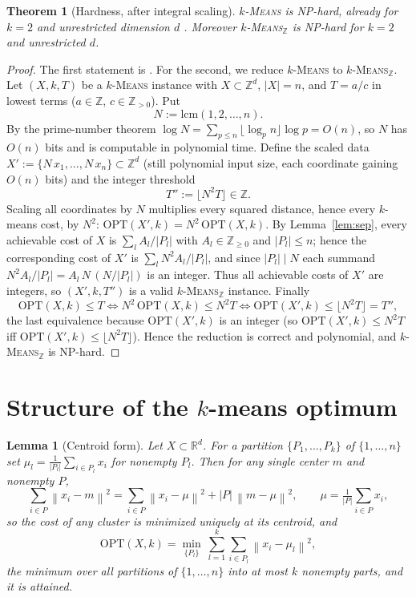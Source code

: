 \documentclass{amsart}
\theoremstyle{plain}
\newtheorem{theorem}{Theorem}
\newtheorem{lemma}{Lemma}
\theoremstyle{definition}
\newcommand{\R}{\mathbb{R}}
\newcommand{\Z}{\mathbb{Z}}
\newcommand{\norm}[1]{\left\lVert #1 \right\rVert}
\begin{document}
\begin{theorem}[Hardness, after integral scaling]\label{thm:kmnp}
\textsc{$k$-Means} is NP-hard, already for $k=2$ and unrestricted dimension $d$
\cite{ADHP}. Moreover \textsc{$k$-Means$_{\Z}$} is NP-hard for $k=2$ and
unrestricted $d$.
\end{theorem}

\begin{proof}
The first statement is \cite{ADHP}. For the second, we reduce \textsc{$k$-Means} to
\textsc{$k$-Means$_{\Z}$}. Let $(X,k,T)$ be a \textsc{$k$-Means} instance with
$X\subset\Z^{d}$, $|X|=n$, and $T=a/c$ in lowest terms ($a\in\Z$, $c\in\Z_{>0}$).
Put
\[
N:=\mathrm{lcm}(1,2,\dots,n).
\]
By the prime-number theorem $\log N=\sum_{p\le n}\lfloor\log_{p}n\rfloor\log p
=O(n)$, so $N$ has $O(n)$ bits and is computable in polynomial time. Define the
scaled data $X':=\{N\,x_{1},\dots,N\,x_{n}\}\subset\Z^{d}$ (still polynomial input
size, each coordinate gaining $O(n)$ bits) and the integer threshold
\[
T'':=\big\lfloor N^{2}T\big\rfloor\in\Z .
\]
Scaling all coordinates by $N$ multiplies every squared distance, hence every
$k$-means cost, by $N^{2}$:
\(
\mathrm{OPT}(X',k)=N^{2}\,\mathrm{OPT}(X,k).
\)
By Lemma~\ref{lem:sep}, every achievable cost of $X$ is $\sum_{l}A_{l}/|P_{l}|$
with $A_{l}\in\Z_{\ge0}$ and $|P_{l}|\le n$; hence the corresponding cost of $X'$ is
$\sum_{l}N^{2}A_{l}/|P_{l}|$, and since $|P_{l}|\mid N$ each summand
$N^{2}A_{l}/|P_{l}|=A_{l}\,N\,(N/|P_{l}|)$ is an integer. Thus all achievable costs
of $X'$ are integers, so $(X',k,T'')$ is a valid \textsc{$k$-Means$_{\Z}$}
instance. Finally
\[
\mathrm{OPT}(X,k)\le T
\iff N^{2}\,\mathrm{OPT}(X,k)\le N^{2}T
\iff \mathrm{OPT}(X',k)\le \lfloor N^{2}T\rfloor=T'',
\]
the last equivalence because $\mathrm{OPT}(X',k)$ is an integer (so
$\mathrm{OPT}(X',k)\le N^{2}T$ iff $\mathrm{OPT}(X',k)\le\lfloor N^{2}T\rfloor$).
Hence the reduction is correct and polynomial, and \textsc{$k$-Means$_{\Z}$} is
NP-hard.
\end{proof}

\section{Structure of the $k$-means optimum}

\begin{lemma}[Centroid form]\label{lem:centroid}
Let $X\subset\R^{d}$. For a partition $\{P_{1},\dots,P_{k}\}$ of $\{1,\dots,n\}$
set $\mu_{l}=\frac{1}{|P_{l}|}\sum_{i\in P_{l}}x_{i}$ for nonempty $P_{l}$. Then
for any single center $m$ and nonempty $P$,
\begin{equation}\label{eq:par}
\sum_{i\in P}\norm{x_{i}-m}^{2}=\sum_{i\in P}\norm{x_{i}-\mu}^{2}+|P|\,\norm{m-\mu}^{2},
\qquad \mu=\tfrac{1}{|P|}\textstyle\sum_{i\in P}x_{i},
\end{equation}
so the cost of any cluster is minimized uniquely at its centroid, and
\[
\mathrm{OPT}(X,k)=\min_{\{P_{l}\}}\ \sum_{l=1}^{k}\sum_{i\in P_{l}}\norm{x_{i}-\mu_{l}}^{2},
\]
the minimum over all partitions of $\{1,\dots,n\}$ into at most $k$ nonempty parts,
and it is attained.
\end{lemma}
\end{document}

